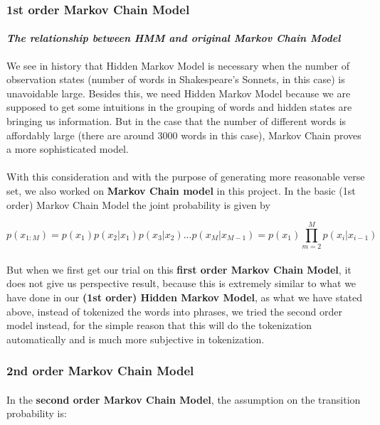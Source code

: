 %
\vspace{5pt}
\subsubsection{1st order Markov Chain Model}
\vspace{5pt}
\paragraph{\textit{The relationship between HMM and original Markov Chain Model}} We see in history that Hidden Markov Model is necessary when the number of observation states (number of words in Shakespeare's Sonnets, in this case) is unavoidable large. Besides this, we need Hidden Markov Model because we are supposed to get some intuitions in the grouping of words and hidden states are bringing us information. But in the case that the number of different words is affordably large (there are around 3000 words in this case), Markov Chain proves a more sophisticated model.
\paragraph{}
With this consideration and with the purpose of generating more reasonable verse set, we also worked on \textbf{Markov Chain model} in this project. In the basic (1st order) Markov Chain Model the joint probability is given by

\begin{equation}
  p(x_{1:M}) = p(x_1)p(x_2|x_1)p(x_3|x_2) ...  p(x_M|x_{M-1}) = p(x_1) \prod\limits_{m=2}^M p(x_i|x_{i-1})
\end{equation}
\paragraph{}
But when we first get our trial on this \textbf{first order Markov Chain Model}, it does not give us perspective result, because this is extremely similar to what we have done in our \textbf{(1st order) Hidden Markov Model}, as what we have stated above, instead of tokenized the words into phrases, we tried the second order model instead, for the simple reason that this will do the tokenization automatically and is much more subjective in tokenization.

\subsubsection{2nd order Markov Chain Model}
\paragraph{}
In the \textbf{second order Markov Chain Model}, the assumption on the transition probability is:

